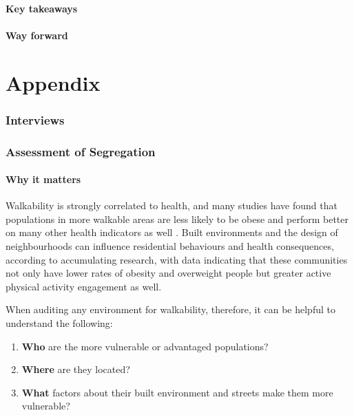 \documentclass[
]{latex/krantz}
\providecommand{\tightlist}{%
  \setlength{\itemsep}{0pt}\setlength{\parskip}{0pt}}
\begin{document}
\hypertarget{key-takeaways}{%
\subsection{Key takeaways}\label{key-takeaways}}

\hypertarget{way-forward}{%
\subsection{Way forward}\label{way-forward}}

\hypertarget{part-appendix}{%
\part{Appendix}\label{part-appendix}}

\hypertarget{interviews}{%
\section{Interviews}\label{interviews}}

\hypertarget{assessment-of-segregation}{%
\section{Assessment of Segregation}\label{assessment-of-segregation}}

\hypertarget{why-it-matters}{%
\subsection{Why it matters}\label{why-it-matters}}

Walkability is strongly correlated to health, and many studies have found that populations in more walkable areas are less likely to be obese \autocite{riggsInclusivelyWalkableExploring2016} and perform better on many other health indicators as well \autocite{suCommunityDeprivationWalkability2017}. Built environments and the design of neighbourhoods can influence residential behaviours and health consequences, according to accumulating research, with data indicating that these communities not only have lower rates of obesity and overweight people but greater active physical activity engagement as well.

When auditing any environment for walkability, therefore, it can be helpful to understand the following:

\begin{enumerate}
\def\labelenumi{\arabic{enumi}.}
\tightlist
\item
  \textbf{Who} are the more vulnerable or advantaged populations?
\item
  \textbf{Where} are they located?
\item
  \textbf{What} factors about their built environment and streets make them more vulnerable?
\end{enumerate}
\end{document}
